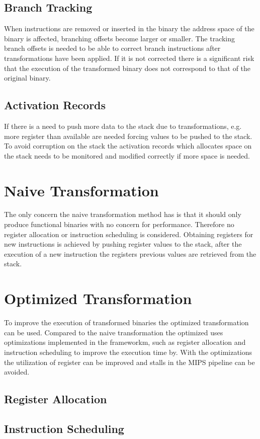 \subsection{Branch Tracking}
When instructions are removed or inserted in the binary the address
space of the binary is affected, branching offsets become larger
or smaller. The tracking branch offsets is needed to be able to correct
branch instructions after transformations have been applied.
If it is not corrected there is a significant risk that
the execution of the transformed binary does not correspond to that of the
original binary.

\subsection{Activation Records}
If there is a need to push more data to the stack due to transformations, e.g. 
more register than available are needed forcing values to be pushed to the stack. 
To avoid corruption on the stack the activation records which allocates space
on the stack needs to be monitored and modified correctly if more space is needed.


\section{Naive Transformation}
The only concern the naive transformation method has is that it should only produce
functional binaries with no concern for performance. Therefore no register
allocation or instruction scheduling is considered. Obtaining registers
for new instructions is achieved by pushing register values to the stack, after
the execution of a new instruction the registers previous values are retrieved
from the stack. 

\section{Optimized Transformation}
To improve the execution of transformed binaries the optimized transformation
can be used. Compared to the naive transformation the optimized uses optimizations
implemented in the frameworkm, such as register allocation and instruction scheduling
to improve the execution time by. With the optimizations the utilization of register
can be improved and stalls in the MIPS pipeline can be avoided.


\subsection{Register Allocation}

\subsection{Instruction Scheduling}

